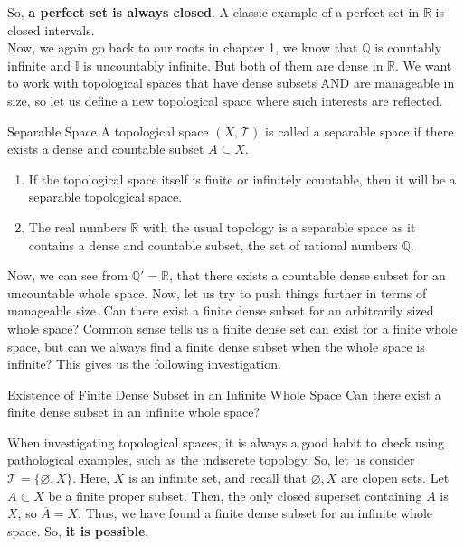 So, \textbf{a perfect set is always closed}. A classic example of a perfect set in $\mathbb{R}$ is closed intervals. \\
Now, we again go back to our roots in chapter 1, we know that $\mathbb{Q}$ is countably infinite and $\mathbb{I}$ is uncountably infinite. But both of them are dense in $\mathbb{R}$. We want to work with topological spaces that have dense subsets AND are manageable in size, so let us define a new topological space where such interests are reflected.
\begin{Definition}{Separable Space}\label{separable_space}
    A topological space $(X,\mathcal{T})$ is called a separable space if there exists a dense and countable subset $A\subseteq X$.
\end{Definition}
\begin{Example}
    \begin{enumerate}[leftmargin=0.5cm]
        \item If the topological space itself is finite or infinitely countable, then it will be a separable topological space.
        \item The real numbers $\mathbb{R}$ with the usual topology is a separable space as it contains a dense and countable subset, the set of rational numbers $\mathbb{Q}$.
    \end{enumerate}
\end{Example}
\noindent Now, we can see from $\mathbb{Q}'=\mathbb{R}$, that there exists a countable dense subset for an uncountable whole space. Now, let us try to push things further in terms of manageable size. Can there exist a finite dense subset for an arbitrarily sized whole space? Common sense tells us a finite dense set can exist for a finite whole space, but can we always find a finite dense subset when the whole space is infinite? This gives us the following investigation.
\begin{Query}{Existence of Finite Dense Subset in an Infinite Whole Space}\label{finite_dense_subset_in_infinite_whole_space}
    Can there exist a finite dense subset in an infinite whole space?
\end{Query}
\begin{Investigation}
    When investigating topological spaces, it is always a good habit to check using pathological examples, such as the indiscrete topology. So, let us consider $\mathcal{T}=\{\varnothing,X\}$. Here, $X$ is an infinite set, and recall that $\varnothing, X$ are clopen sets. Let $A\subset X$ be a finite proper subset. Then, the only closed superset containing $A$ is $X$, so $\overline{A}=X$. Thus, we have found a finite dense subset for an infinite whole space. So, \textbf{it is possible}.
\end{Investigation}
